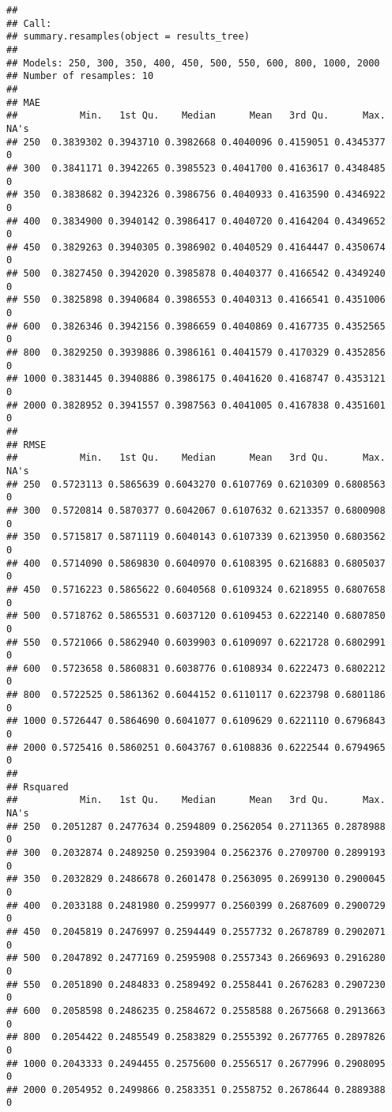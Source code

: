 \documentclass[
]{article}
\begin{document}
\begin{verbatim}
## 
## Call:
## summary.resamples(object = results_tree)
## 
## Models: 250, 300, 350, 400, 450, 500, 550, 600, 800, 1000, 2000 
## Number of resamples: 10 
## 
## MAE 
##           Min.   1st Qu.    Median      Mean   3rd Qu.      Max. NA's
## 250  0.3839302 0.3943710 0.3982668 0.4040096 0.4159051 0.4345377    0
## 300  0.3841171 0.3942265 0.3985523 0.4041700 0.4163617 0.4348485    0
## 350  0.3838682 0.3942326 0.3986756 0.4040933 0.4163590 0.4346922    0
## 400  0.3834900 0.3940142 0.3986417 0.4040720 0.4164204 0.4349652    0
## 450  0.3829263 0.3940305 0.3986902 0.4040529 0.4164447 0.4350674    0
## 500  0.3827450 0.3942020 0.3985878 0.4040377 0.4166542 0.4349240    0
## 550  0.3825898 0.3940684 0.3986553 0.4040313 0.4166541 0.4351006    0
## 600  0.3826346 0.3942156 0.3986659 0.4040869 0.4167735 0.4352565    0
## 800  0.3829250 0.3939886 0.3986161 0.4041579 0.4170329 0.4352856    0
## 1000 0.3831445 0.3940886 0.3986175 0.4041620 0.4168747 0.4353121    0
## 2000 0.3828952 0.3941557 0.3987563 0.4041005 0.4167838 0.4351601    0
## 
## RMSE 
##           Min.   1st Qu.    Median      Mean   3rd Qu.      Max. NA's
## 250  0.5723113 0.5865639 0.6043270 0.6107769 0.6210309 0.6808563    0
## 300  0.5720814 0.5870377 0.6042067 0.6107632 0.6213357 0.6800908    0
## 350  0.5715817 0.5871119 0.6040143 0.6107339 0.6213950 0.6803562    0
## 400  0.5714090 0.5869830 0.6040970 0.6108395 0.6216883 0.6805037    0
## 450  0.5716223 0.5865622 0.6040568 0.6109324 0.6218955 0.6807658    0
## 500  0.5718762 0.5865531 0.6037120 0.6109453 0.6222140 0.6807850    0
## 550  0.5721066 0.5862940 0.6039903 0.6109097 0.6221728 0.6802991    0
## 600  0.5723658 0.5860831 0.6038776 0.6108934 0.6222473 0.6802212    0
## 800  0.5722525 0.5861362 0.6044152 0.6110117 0.6223798 0.6801186    0
## 1000 0.5726447 0.5864690 0.6041077 0.6109629 0.6221110 0.6796843    0
## 2000 0.5725416 0.5860251 0.6043767 0.6108836 0.6222544 0.6794965    0
## 
## Rsquared 
##           Min.   1st Qu.    Median      Mean   3rd Qu.      Max. NA's
## 250  0.2051287 0.2477634 0.2594809 0.2562054 0.2711365 0.2878988    0
## 300  0.2032874 0.2489250 0.2593904 0.2562376 0.2709700 0.2899193    0
## 350  0.2032829 0.2486678 0.2601478 0.2563095 0.2699130 0.2900045    0
## 400  0.2033188 0.2481980 0.2599977 0.2560399 0.2687609 0.2900729    0
## 450  0.2045819 0.2476997 0.2594449 0.2557732 0.2678789 0.2902071    0
## 500  0.2047892 0.2477169 0.2595908 0.2557343 0.2669693 0.2916280    0
## 550  0.2051890 0.2484833 0.2589492 0.2558441 0.2676283 0.2907230    0
## 600  0.2058598 0.2486235 0.2584672 0.2558588 0.2675668 0.2913663    0
## 800  0.2054422 0.2485549 0.2583829 0.2555392 0.2677765 0.2897826    0
## 1000 0.2043333 0.2494455 0.2575600 0.2556517 0.2677996 0.2908095    0
## 2000 0.2054952 0.2499866 0.2583351 0.2558752 0.2678644 0.2889388    0
\end{verbatim}
\end{document}

